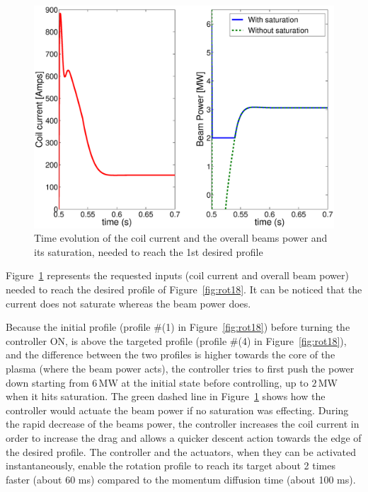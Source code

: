 \documentclass[12pt]{iopart}
\begin{document}
\begin{figure}
\centering
\includegraphics[width=\linewidth]{imene_figs/Goum19ln} 
\caption{Time evolution of the coil current and the overall beams power and its saturation, needed to reach the 1st desired profile }
\label{fig:rot19}
\end{figure} 

Figure~\ref{fig:rot19} represents the requested inputs (coil current and overall beam power) needed to reach the desired profile of Figure~\ref{fig:rot18}. It can be noticed that the current does not saturate whereas the beam power does.

Because the initial profile (profile \#(1) in Figure~\ref{fig:rot18}) before turning the controller ON, is above the targeted profile  (profile \#(4) in Figure~\ref{fig:rot18}), and the difference between the two profiles is higher towards the core of the plasma (where the beam power acts), the controller tries to first push the power down starting from $6$\,MW at the initial state before controlling, up to $2$\,MW when it hits saturation. The green dashed line in Figure~\ref{fig:rot19} shows how the controller would actuate the beam power if no saturation was effecting. During the rapid decrease of the beams power, the controller increases the coil current in order to increase the drag and allows a quicker descent action towards the edge of the desired profile.  
The controller and the actuators, when they can be activated instantaneously, enable the rotation profile to reach its target about 2 times faster (about 60 ms) compared to the momentum diffusion time (about 100 ms).
\end{document}
